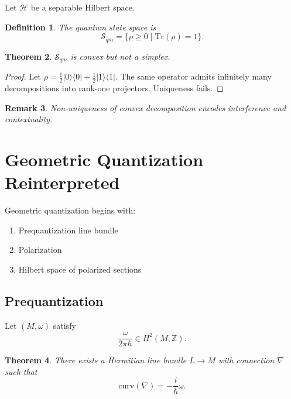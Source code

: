 \documentclass[11pt]{article}
\newtheorem{theorem}{Theorem}[section]
\newtheorem{definition}[theorem]{Definition}
\newtheorem{remark}[theorem]{Remark}
\begin{document}
Let $\mathcal{H}$ be a separable Hilbert space.

\begin{definition}
The quantum state space is
\[
\mathcal{S}_{qm}
=
\{ \rho \ge 0 \mid \mathrm{Tr}(\rho)=1 \}.
\]
\end{definition}

\begin{theorem}
$\mathcal{S}_{qm}$ is convex but not a simplex.
\end{theorem}

\begin{proof}
Let $\rho = \frac12 |0\rangle\langle0|
+ \frac12 |1\rangle\langle1|$.
The same operator admits infinitely many decompositions
into rank-one projectors.
Uniqueness fails.
\end{proof}

\begin{remark}
Non-uniqueness of convex decomposition encodes interference
and contextuality.
\end{remark}

\section{Geometric Quantization Reinterpreted}

Geometric quantization begins with:

\begin{enumerate}
\item Prequantization line bundle
\item Polarization
\item Hilbert space of polarized sections
\end{enumerate}

\subsection{Prequantization}

Let $(M,\omega)$ satisfy
\[
\frac{\omega}{2\pi\hbar} \in H^2(M,\mathbb{Z}).
\]

\begin{theorem}
There exists a Hermitian line bundle $L \to M$
with connection $\nabla$
such that
\[
\mathrm{curv}(\nabla) = -\frac{i}{\hbar}\omega.
\]
\end{theorem}
\end{document}
